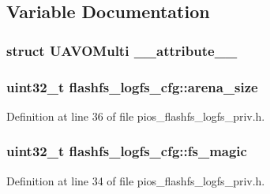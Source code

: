 \subsection{\-Variable \-Documentation}
\hypertarget{group___p_i_o_s___f_l_a_s_h_f_s_ga043afd6646bf00b1155399e12818f798}{
\subsubsection[{\-\_\-\-\_\-attribute\-\_\-\-\_\-}]{\setlength{\rightskip}{0pt plus 5cm}struct {\bf \-U\-A\-V\-O\-Multi} {\bf \-\_\-\-\_\-attribute\-\_\-\-\_\-}}}\label{group___p_i_o_s___f_l_a_s_h_f_s_ga043afd6646bf00b1155399e12818f798}
\hypertarget{group___p_i_o_s___f_l_a_s_h_f_s_ga838dc01d5c7c1796252597dbb2d1dc04}{
\subsubsection[{arena\-\_\-size}]{\setlength{\rightskip}{0pt plus 5cm}uint32\-\_\-t {\bf flashfs\-\_\-logfs\-\_\-cfg\-::arena\-\_\-size}}}\label{group___p_i_o_s___f_l_a_s_h_f_s_ga838dc01d5c7c1796252597dbb2d1dc04}


\-Definition at line 36 of file pios\-\_\-flashfs\-\_\-logfs\-\_\-priv.\-h.

\hypertarget{group___p_i_o_s___f_l_a_s_h_f_s_ga1fe17f8582e422dfe871844653d7d6f9}{
\subsubsection[{fs\-\_\-magic}]{\setlength{\rightskip}{0pt plus 5cm}uint32\-\_\-t {\bf flashfs\-\_\-logfs\-\_\-cfg\-::fs\-\_\-magic}}}\label{group___p_i_o_s___f_l_a_s_h_f_s_ga1fe17f8582e422dfe871844653d7d6f9}


\-Definition at line 34 of file pios\-\_\-flashfs\-\_\-logfs\-\_\-priv.\-h.

